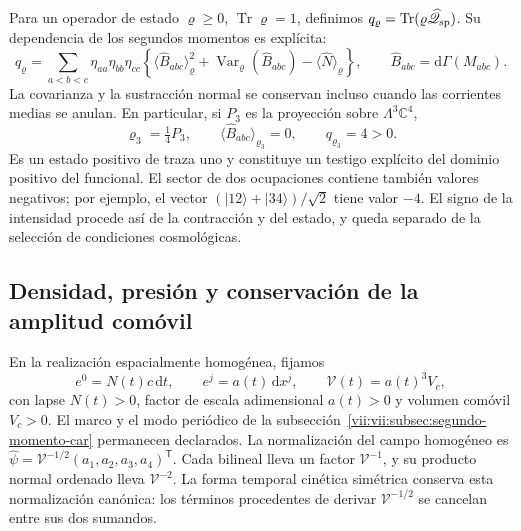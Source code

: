 Para un operador de estado \(\varrho\geq0\),
\(\operatorname{Tr}\varrho=1\), definimos
\(q_\varrho=\operatorname{Tr}(\varrho\widehat{\mathscr Q}_{\rm sp})\).
Su dependencia de los segundos momentos es explícita:
\begin{equation}
 q_\varrho=\sum_{a<b<c}\eta_{aa}\eta_{bb}\eta_{cc}
 \left\{
  \langle\widehat B_{abc}\rangle_\varrho^2
  +\operatorname{Var}_\varrho(\widehat B_{abc})
  -\langle\widehat N\rangle_\varrho
 \right\},\qquad
 \widehat B_{abc}=\mathrm d\Gamma(M_{abc}).
 \label{vii:vii:eq:covarianza-espin-material}
\end{equation}
La covarianza y la sustracción normal se conservan incluso cuando
las corrientes medias se anulan. En particular, si \(P_3\) es la
proyección sobre \(\Lambda^3\mathbb C^4\),
\begin{equation}
 \varrho_3=\tfrac14P_3,\qquad
 \langle\widehat B_{abc}\rangle_{\varrho_3}=0,\qquad
 q_{\varrho_3}=4>0.
 \label{vii:vii:eq:testigo-positivo-espin}
\end{equation}
Es un estado positivo de traza uno y constituye un testigo explícito
del dominio positivo del funcional. El sector de dos ocupaciones
contiene también valores negativos; por ejemplo, el vector
\((|12\rangle+|34\rangle)/\sqrt2\) tiene valor \(-4\).
El signo de la intensidad procede así de la contracción y del
estado, y queda separado de la selección de condiciones cosmológicas.

\subsection{Densidad, presión y conservación de la amplitud comóvil}
\label{vii:vii:subsec:amplitud-espinorial-comovil}

En la realización espacialmente homogénea, fijamos
\[
 e^0=N(t)c\,\mathrm dt,\qquad e^j=a(t)\,\mathrm dx^j,
 \qquad \mathcal V(t)=a(t)^3V_c,
\]
con lapse \(N(t)>0\), factor de escala adimensional \(a(t)>0\)
y volumen comóvil \(V_c>0\). El marco y el modo periódico de la
subsección~\ref{vii:vii:subsec:segundo-momento-car} permanecen declarados.
La normalización del campo homogéneo es
\(\widehat\psi=\mathcal V^{-1/2}(a_1,a_2,a_3,a_4)^{\mathsf T}\).
Cada bilineal lleva un factor \(\mathcal V^{-1}\), y su producto
normal ordenado lleva \(\mathcal V^{-2}\). La forma temporal
cinética simétrica conserva esta normalización canónica: los términos
procedentes de derivar \(\mathcal V^{-1/2}\) se cancelan entre
sus dos sumandos.

